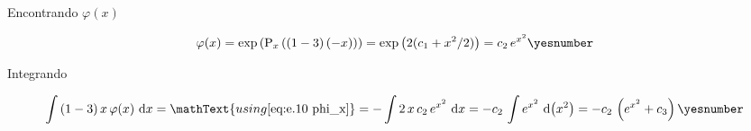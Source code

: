 \documentclass["AM3C-Slides_annotations.tex"]{subfiles}
\begin{document}
\begin{exampleBox}
  Encontrando \(\varphi(x)\)
  \begin{tcolorbox}
    \begin{gather*}
      \varphi(x)
      = \exp{\left(
          \prim_x\left(
            (1-3)\,(-x)
          \right)
      \right)}
      = \exp{\left(
          2(c_1+x^2/2)
      \right)}
      = c_2\,e^{x^2}
      \yesnumber\label{eq:e.10 phi_x}
    \end{gather*}
  \end{tcolorbox}
  
  Integrando
  \begin{tcolorbox}
    \begin{gather*}
      \int{
        (1-3)\,x
        \,\varphi(x)
        \,\odif{x}
      }
      = \mathText{using \eqref{eq:e.10 phi_x}}
      = -\int{
        2\,x
        \,c_2\,e^{x^2}
        \,\odif{x}
      }
      = -c_2
      \,\int{
        e^{x^2}
        \,\odif{\left( x^2 \right)}
      }
      = -c_2
      \,\left(
        e^{x^2}+c_3
      \right)
      \yesnumber\label{eq:e.10 prim}
    \end{gather*}
  \end{tcolorbox}
  
\end{exampleBox}
\end{document}
